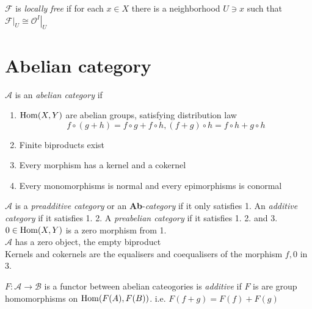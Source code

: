 \documentclass[main]{subfiles}
\begin{document}
\begin{definition}
$\mathcal F$ is \textit{locally free} if for each $x\in X$ there is a neighborhood $U\ni x$ such that $\mathcal F|_U\cong\left.\mathcal O^I\right|_U$
\end{definition}

\newpage

\section{Abelian category}

\begin{definition}
$\mathscr A$ is an \textit{abelian category} if
\begin{enumerate}
\item $\operatorname{Hom}(X,Y)$ are abelian groups, satisfying distribution law
\[f\circ(g+h)=f\circ g+f\circ h,(f+g)\circ h=f\circ h+g\circ h\]
\item Finite biproducts exist
\item Every morphism has a kernel and a cokernel
\item Every monomorphisms is normal and every epimorphisms is conormal
\end{enumerate}
\end{definition}

\begin{note}
$\mathscr A$ is a \textit{preadditive category} or an \textbf{Ab}-\textit{category} if it only satisfies 1. An \textit{additive category} if it satisfies 1. 2. A \textit{preabelian category} if it satisfies 1. 2. and 3. \\
$0\in \operatorname{Hom}(X,Y)$ is a zero morphism from 1. \\
$\mathscr A$ has a zero object, the empty biproduct \\
Kernels and cokernels are the equalisers and coequalisers of the morphism $f,0$ in 3.
\end{note}

\begin{definition}
$F:\mathscr A\to\mathscr B$ is a functor between abelian cateogories is \textit{additive} if $F$ is are group homomorphisms on $\operatorname{Hom}(F(A),F(B))$. i.e. $F(f+g)=F(f)+F(g)$
\end{definition}
\end{document}
